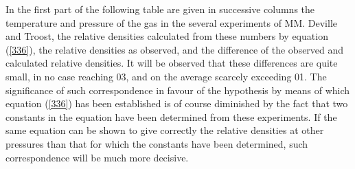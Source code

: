\documentclass[12pt]{article}
\begin{document}
In the first part of the following table are given in successive columns the temperature and pressure of the gas in the several experiments of MM. Deville and Troost, the relative densities calculated from these numbers by equation (\ref{336}), the relative densities as observed, and the difference of the observed and calculated relative densities. It will be observed that these differences are quite small, in no case reaching 03, and on the average scarcely exceeding 01. The significance of such correspondence in favour of the hypothesis by means of which equation (\ref{336}) has been established is of course diminished by the fact that two constants in the equation have been determined from these experiments. If the same equation can be shown to give correctly the relative densities at other pressures than that for which the constants have been determined, such correspondence will be much more decisive.
\end{document}
